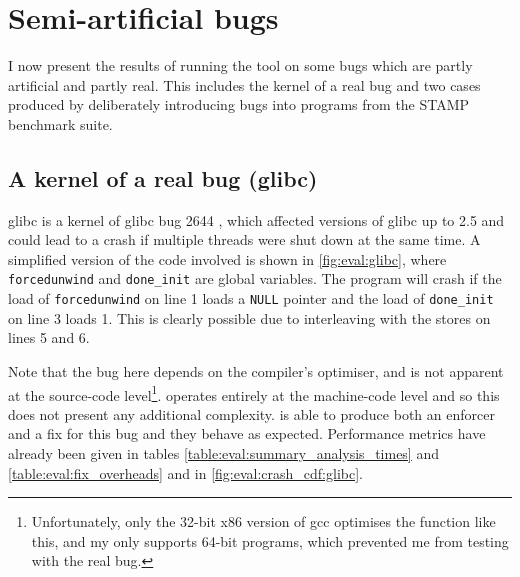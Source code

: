 \section{Semi-artificial bugs}
\label{sect:eval:semiartificial}

I now present the results of running the tool on some bugs which are
partly artificial and partly real.  This includes the kernel of a real
bug and two cases produced by deliberately introducing bugs into
programs from the STAMP benchmark suite\needCite{}.

\subsection{A kernel of a real bug (glibc)}
\label{sect:eval:glibc}


glibc is a kernel of glibc bug 2644 \cite{Cambell2006}, which
affected versions of glibc up to 2.5 and could lead to a crash if
multiple threads were shut down at the same time.  A simplified
version of the code involved is shown in \autoref{fig:eval:glibc},
where \texttt{forcedunwind} and \texttt{done\_init} are global
variables.  The program will crash if the load of
\texttt{forcedunwind} on line 1 loads a \texttt{NULL} pointer and the
load of \texttt{done\_init} on line 3 loads 1.  This is clearly
possible due to interleaving with the stores on lines 5 and 6.

Note that the bug here depends on the compiler's optimiser, and is not
apparent at the source-code level\footnote{Unfortunately, only the
  32-bit x86 version of gcc optimises the function like this, and my
  {\implementation} only supports 64-bit programs, which prevented me
  from testing with the real bug.}.  {\Technique} operates entirely at
the machine-code level and so this does not present any additional
complexity.  {\Technique} is able to produce both an enforcer and a
fix for this bug and they behave as expected.  Performance metrics
have already been given in tables
\ref{table:eval:summary_analysis_times} and
\ref{table:eval:fix_overheads} and in
\autoref{fig:eval:crash_cdf:glibc}.


